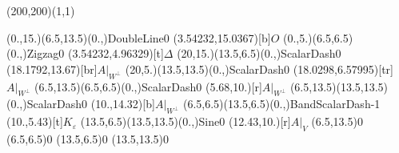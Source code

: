 \unitlength=1bp%

\begin{feynartspicture}(200,200)(1,1)

\FADiagram{}
\FAProp(0.,15.)(6.5,13.5)(0.,){DoubleLine}{0}
\FALabel(3.54232,15.0367)[b]{$O$}
\FAProp(0.,5.)(6.5,6.5)(0.,){Zigzag}{0}
\FALabel(3.54232,4.96329)[t]{$\Delta$}
\FAProp(20,15.)(13.5,6.5)(0.,){ScalarDash}{0}
\FALabel(18.1792,13.67)[br]{$A|_{W^\perp}$}
\FAProp(20,5.)(13.5,13.5)(0.,){ScalarDash}{0}
\FALabel(18.0298,6.57995)[tr]{$A|_{W^\perp}$}
\FAProp(6.5,13.5)(6.5,6.5)(0.,){ScalarDash}{0}
\FALabel(5.68,10.)[r]{$A|_{W^\perp}$}
\FAProp(6.5,13.5)(13.5,13.5)(0.,){ScalarDash}{0}
\FALabel(10.,14.32)[b]{$A|_{W^\perp}$}
\FAProp(6.5,6.5)(13.5,6.5)(0.,){BandScalarDash}{-1}
\FALabel(10.,5.43)[t]{$K_\varepsilon$}
\FAProp(13.5,6.5)(13.5,13.5)(0.,){Sine}{0}
\FALabel(12.43,10.)[r]{$A|_V$}
\FAVert(6.5,13.5){0}
\FAVert(6.5,6.5){0}
\FAVert(13.5,6.5){0}
\FAVert(13.5,13.5){0}
\end{feynartspicture}

